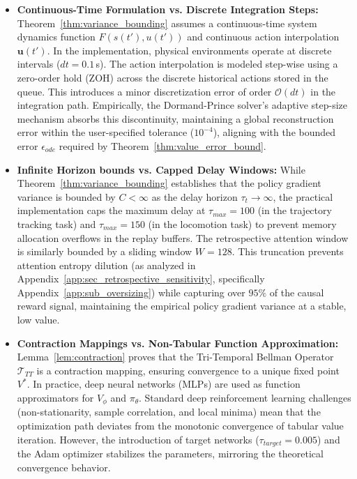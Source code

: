 \documentclass[manuscript, screen, review]{jair}
\begin{document}
\begin{itemize}
    \item \textbf{Continuous-Time Formulation vs. Discrete Integration Steps:}
    Theorem~\ref{thm:variance_bounding} assumes a continuous-time system dynamics function $F(s(t'), u(t'))$ and continuous action interpolation $\mathbf{u}(t')$. In the implementation, physical environments operate at discrete intervals ($dt = 0.1\,$s). The action interpolation is modeled step-wise using a zero-order hold (ZOH) across the discrete historical actions stored in the queue. This introduces a minor discretization error of order $\mathcal{O}(dt)$ in the integration path. Empirically, the Dormand-Prince solver's adaptive step-size mechanism absorbs this discontinuity, maintaining a global reconstruction error within the user-specified tolerance ($10^{-4}$), aligning with the bounded error $\epsilon_{ode}$ required by Theorem~\ref{thm:value_error_bound}.
    \item \textbf{Infinite Horizon bounds vs. Capped Delay Windows:}
    While Theorem~\ref{thm:variance_bounding} establishes that the policy gradient variance is bounded by $C < \infty$ as the delay horizon $\tau_t \to \infty$, the practical implementation caps the maximum delay at $\tau_{max} = 100$ (in the trajectory tracking task) and $\tau_{max} = 150$ (in the locomotion task) to prevent memory allocation overflows in the replay buffers. The retrospective attention window is similarly bounded by a sliding window $W = 128$. This truncation prevents attention entropy dilution (as analyzed in Appendix~\ref{app:sec_retrospective_sensitivity}, specifically Appendix~\ref{app:sub_oversizing}) while capturing over $95\%$ of the causal reward signal, maintaining the empirical policy gradient variance at a stable, low value.
    \item \textbf{Contraction Mappings vs. Non-Tabular Function Approximation:}
    Lemma~\ref{lem:contraction} proves that the Tri-Temporal Bellman Operator $\mathcal{T}_{TT}$ is a contraction mapping, ensuring convergence to a unique fixed point $V^*$. In practice, deep neural networks (MLPs) are used as function approximators for $V_\phi$ and $\pi_\theta$. Standard deep reinforcement learning challenges (non-stationarity, sample correlation, and local minima) mean that the optimization path deviates from the monotonic convergence of tabular value iteration. However, the introduction of target networks ($\tau_{target} = 0.005$) and the Adam optimizer stabilizes the parameters, mirroring the theoretical convergence behavior.
\end{itemize}
\end{document}
